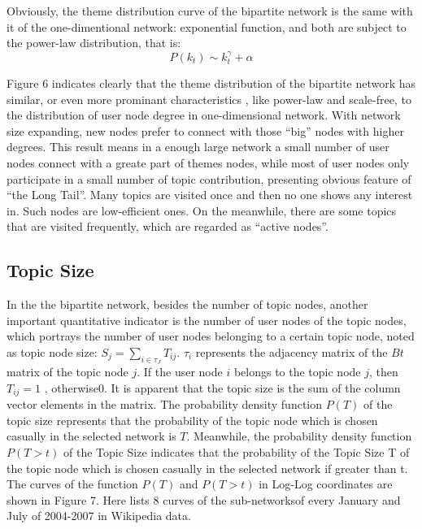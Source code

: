 \documentclass{elsarticle}
\begin{document}
Obviously, the theme distribution curve of the bipartite network is the same with it of the one-dimentional network: exponential function, and both are subject to the power-law distribution, that is: 
\begin{equation}
  \label{eq:2}
  P(k_t)\sim k_t^{\gamma}+\alpha
\end{equation}

Figure 6 indicates clearly that the theme distribution of the
bipartite network has similar, or even more prominant characteristics
, like power-law and scale-free, 
to the distribution of user node degree in one-dimensional network.
With network size expanding,  new nodes prefer to connect with those
“big” nodes with higher degrees. This result means in a enough large
network a small number of user nodes connect with a greate part of
themes nodes, while most of user nodes only participate in a small number of topic contribution, presenting obvious feature of “the Long Tail”. Many topics are visited once and then no one shows any interest in. Such nodes are low-efficient ones. On the meanwhile, there are some topics that are visited frequently, which are regarded as “active nodes”. 

\subsection{Topic Size}
\label{sec:topic-size}

In the the bipartite network, besides the number of topic
nodes, another important quantitative indicator is the number of user
nodes of the topic nodes, which portrays the number of user nodes
belonging to a certain  topic node, noted as topic node size: $S_j
= \sum_{i \in \tau_{J}}T_{ij}$. $\tau_i$  represents
the adjacency matrix of the $Bt$ matrix of the topic node $j$. If the user
node $i$ belongs to the topic node $j$, then $T_{ij}=1$ , otherwise0. It is apparent that the topic size is the sum of the column vector
elements in the matrix. The probability density function $P(T)$  of
the topic size represents that the probability of the topic node which
is chosen casually in the selected network is $T$. Meanwhile, the
probability density function $P(T>t)$  of the Topic Size indicates
that the probability of the Topic Size T of the topic node which is
chosen casually in the selected network if greater than t. The curves
of the function $P(T)$  and  $P(T>t)$  in Log-Log coordinates are
shown in Figure 7.  Here lists 8 curves of the sub-networksof every
January and July of 2004-2007 in Wikipedia data.
\end{document}
